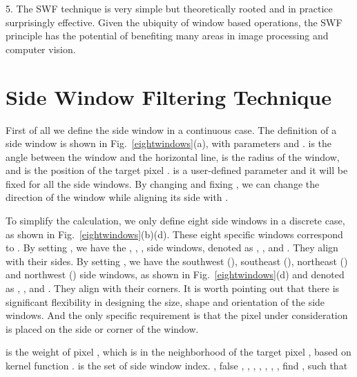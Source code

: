\documentclass[10pt,twocolumn,letterpaper]{article}
\begin{document}
5. The SWF technique is very simple but theoretically rooted and in practice surprisingly effective. Given the ubiquity of window based operations, the SWF principle has the potential of benefiting many areas in image processing and computer vision.  



\begin{figure*}[htbp] 
	\centering
	\caption{Definition of side window.  is the radius of the window. (a) The definition of side window in continuous case. (b) The  (red rectangle) and  (blue rectangle) side windows. (c) The  (red rectangle) and  (blue rectangle) side windows. (d) The  (red rectangle),  (blue rectangle),  (green rectangle) and  (orange rectangle) side windows.}
	\label{eightwindows}
\end{figure*}





\section{Side Window Filtering Technique}
First of all we define the side window in a continuous case. The definition of a side window is shown in Fig.~\ref{eightwindows}(a), with parameters  and .  is the angle between the window and the horizontal line,  is the radius of the window,  and  is the position of the target pixel .  is a user-defined parameter and it will be fixed for all the side windows. By changing  and fixing , we can change the direction of the window while aligning its side with . 

To simplify the calculation, we only define eight side windows in a discrete case, as shown in Fig.~\ref{eightwindows}(b)(d). These eight specific windows correspond to . By setting , we have the  , , ,  side windows, denoted as , ,  and . They align  with their sides. By setting , we have the southwest (), southeast (), northeast () and northwest () side windows, as shown in Fig.~\ref{eightwindows}(d) and denoted as , ,  and . They align  with their corners. It is worth pointing out that there is significant flexibility in designing the size, shape and orientation of the side windows. And the only specific requirement is that the pixel under consideration is placed on the side or corner of the window.
\begin{algorithm}[!htb]
	\caption{Calculate the SWF for each pixel} \label{algo_swf}
	\begin{algorithmic}[1]
		\REQUIRE  is the weight of pixel , which is in the neighborhood of the target pixel , based on kernel function .  is the set of side window index.
		\STATE , 
		\if false
		\STATE , 
		\STATE , 
		\STATE , 
		\STATE , 
		\STATE , 
		\STATE , 
		\STATE , 
		\fi
		\STATE find , such that 
		\ENSURE 
	\end{algorithmic}
\end{algorithm} 
\end{document}

